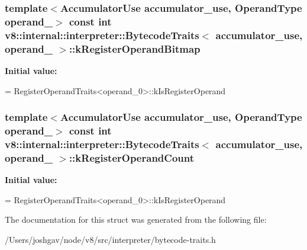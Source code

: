\subsubsection[{\texorpdfstring{k\+Register\+Operand\+Bitmap}{kRegisterOperandBitmap}}]{\setlength{\rightskip}{0pt plus 5cm}template$<$Accumulator\+Use accumulator\+\_\+use, Operand\+Type operand\+\_$>$ const int {\bf v8\+::internal\+::interpreter\+::\+Bytecode\+Traits}$<$ accumulator\+\_\+use, operand\+\_ $>$\+::k\+Register\+Operand\+Bitmap\hspace{0.3cm}{\ttfamily [static]}}\hypertarget{structv8_1_1internal_1_1interpreter_1_1_bytecode_traits_3_01accumulator__use_00_01operand__0_01_4_aa56aa508c2d3de128fde560ec6fb4f70}{}\label{structv8_1_1internal_1_1interpreter_1_1_bytecode_traits_3_01accumulator__use_00_01operand__0_01_4_aa56aa508c2d3de128fde560ec6fb4f70}
{\bfseries Initial value\+:}
\begin{DoxyCode}
=
      RegisterOperandTraits<operand\_0>::kIsRegisterOperand
\end{DoxyCode}
\subsubsection[{\texorpdfstring{k\+Register\+Operand\+Count}{kRegisterOperandCount}}]{\setlength{\rightskip}{0pt plus 5cm}template$<$Accumulator\+Use accumulator\+\_\+use, Operand\+Type operand\+\_$>$ const int {\bf v8\+::internal\+::interpreter\+::\+Bytecode\+Traits}$<$ accumulator\+\_\+use, operand\+\_ $>$\+::k\+Register\+Operand\+Count\hspace{0.3cm}{\ttfamily [static]}}\hypertarget{structv8_1_1internal_1_1interpreter_1_1_bytecode_traits_3_01accumulator__use_00_01operand__0_01_4_ad7f9f35f7c3356a4be2fab2ec5e184d0}{}\label{structv8_1_1internal_1_1interpreter_1_1_bytecode_traits_3_01accumulator__use_00_01operand__0_01_4_ad7f9f35f7c3356a4be2fab2ec5e184d0}
{\bfseries Initial value\+:}
\begin{DoxyCode}
=
      RegisterOperandTraits<operand\_0>::kIsRegisterOperand
\end{DoxyCode}


The documentation for this struct was generated from the following file\+:\begin{DoxyCompactItemize}
\item 
/\+Users/joshgav/node/v8/src/interpreter/bytecode-\/traits.\+h\end{DoxyCompactItemize}
